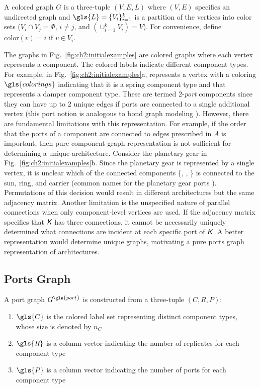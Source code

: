 \begin{definition} \label{def:ch2:cgraph}
A colored graph $G$ is a three-tuple $(V,E,L)$ where $(V,E)$ specifies an undirected graph and $\gls{L}=\{V_i\}^k_{i=1}$ is a partition of the vertices into color sets ($V_i \cap V_j = \Phi$, $i \neq j$, and $(\cup_{i=1}^k V_i) = V$). For convenience, define $\mathrm{color}(v) = i$ if $v\in V_i$.
\end{definition}

The graphs in Fig.~\ref{fig:ch2:initialexamples} are colored graphs where each vertex represents a component. The colored labels indicate different component types. For example, in Fig.~\ref{fig:ch2:initialexamples}a,  represents a vertex with a coloring $\gls{colorings}$ indicating that it is a spring component type and that  represents a damper component type. These are termed 2-\textit{port} components since they can have up to 2 unique edges if ports are connected to a single additional vertex (this port notion is analogous to bond graph modeling \cite{Wu2008a}).
However, there are fundamental limitations with this representation. For example, 
if the order that the ports of a component are connected to edges prescribed in $A$ is important, then pure component graph representation is not sufficient for determining a unique architecture. Consider the planetary gear  in Fig.~\ref{fig:ch2:initialexamples}b. Since the planetary gear is represented by a single vertex, it is unclear which of the connected components \{, , \} is connected to the sun, ring, and carrier (common names for the planetary gear ports \cite{Bayrak2016a}). Permutations of this decision would result in different architectures but the same adjacency matrix. Another limitation is the unspecified nature of parallel connections when only component-level vertices are used. If the adjacency matrix specifies that $\textsl{\textsf{K}}$ has three connections, it cannot be necessarily uniquely determined what connections are incident at each specific port of $\textsl{\textsf{K}}$. A better representation would determine unique graphs, motivating a pure ports graph representation of architectures.

\subsection{Ports Graph}

A port graph $G^{\gls{port}}$ is constructed from a three-tuple $({C},{R},{P})$: 
\begin{enumerate}[label=$\bullet$, leftmargin=*, widest=$\bullet$, nosep]

\item $\gls{C}$ is the colored label set representing distinct component types, whose size is denoted by $n_C$

\item $\gls{R}$ is a column vector indicating the number of replicates for each component type

\item $\gls{P}$ is a column vector indicating the number of ports for each component type
\end{enumerate}

